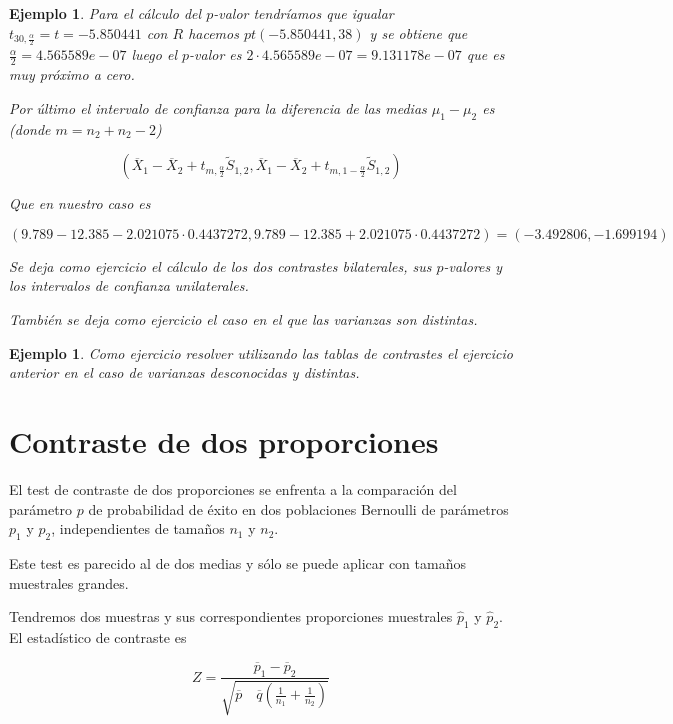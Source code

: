 \documentclass[12pt]{report}
\newtheorem{example}[definition]{Ejemplo}
\begin{document}
\begin{example}
Para el cálculo del $p$-valor  tendríamos que igualar $t_{30,\frac{\alpha}{2}}=t=-5.850441$  con $R$ hacemos 
$pt(-5.850441,38)$ y se obtiene que  $\frac{\alpha}{2}=4.565589e-07$ luego el $p$-valor es $2\cdot 4.565589e-07=
9.131178e-07$ que es muy próximo a cero.


Por último el intervalo de confianza para la diferencia de las medias $\mu_1-\mu_2$ es (donde $m=n_2+n_2-2$)


$$(\overline{X}_1 -\overline{X}_2
+t_{m,\frac{\alpha}{2}} \tilde{S}_{1,2},\overline{X}_1 -\overline{X}_2
+t_{m,1-\frac{\alpha}{2}}
\tilde{S}_{1,2})$$



Que en nuestro caso es 

$$(9.789-12.385-2.021075\cdot  0.4437272,9.789-12.385+2.021075\cdot 
0.4437272)= ( -3.492806, -1.699194)$$





 
 Se deja como ejercicio el cálculo de los dos contrastes bilaterales, sus $p$-valores y los intervalos de confianza unilaterales.
 
 
 También se deja como ejercicio el caso en el que las varianzas son distintas.
\end{example}



\begin{example}

Como ejercicio resolver  utilizando las tablas de contrastes el  ejercicio anterior en el caso de varianzas desconocidas y distintas.
\end{example}


\section{Contraste de dos proporciones}


El test de contraste de dos proporciones se enfrenta a la comparación del parámetro $p$ de probabilidad de éxito en dos poblaciones Bernoulli de parámetros $p_1$ y $p_2$, independientes de tamaños $n_1$ y $n_2$.

Este test es parecido al de dos medias y sólo se puede aplicar con tamaños muestrales grandes.


Tendremos dos muestras y sus correspondientes proporciones muestrales $\hat{p}_1$ y $\hat{p}_2$. El estadístico de contraste es 


$$Z=\frac{\overline{p}_1 -\overline{p}_2}{
\sqrt{\overline{p}\quad\overline{q}\left(\frac{1}{n_1}+\frac{1}{n_2}\right)}}$$
\end{document}
